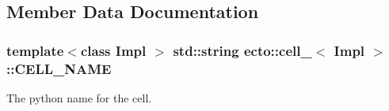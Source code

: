 \subsection{Member Data Documentation}
\hypertarget{structecto_1_1cell___aaa9154887542b8d7152f8199e9c6c9bd}{
\subsubsection[{C\-E\-L\-L\-\_\-\-N\-A\-M\-E}]{\setlength{\rightskip}{0pt plus 5cm}template$<$class Impl $>$ std\-::string {\bf ecto\-::cell\-\_\-}$<$ Impl $>$\-::C\-E\-L\-L\-\_\-\-N\-A\-M\-E\hspace{0.3cm}{\ttfamily [static]}}}\label{structecto_1_1cell___aaa9154887542b8d7152f8199e9c6c9bd}


The python name for the cell. 

